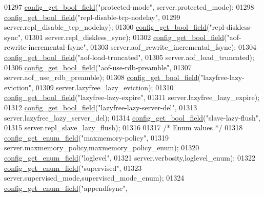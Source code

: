 \begin{DoxyCode}
{{{{{{{{{{01297     \hyperlink{config_8c_a7dbc6f4e538d2db2aa10ae47511d6c92}{config\_get\_bool\_field}(\textcolor{stringliteral}{"protected-mode"}, server.protected\_mode);
01298     \hyperlink{config_8c_a7dbc6f4e538d2db2aa10ae47511d6c92}{config\_get\_bool\_field}(\textcolor{stringliteral}{"repl-disable-tcp-nodelay"},
01299             server.repl\_disable\_tcp\_nodelay);
01300     \hyperlink{config_8c_a7dbc6f4e538d2db2aa10ae47511d6c92}{config\_get\_bool\_field}(\textcolor{stringliteral}{"repl-diskless-sync"},
01301             server.repl\_diskless\_sync);
01302     \hyperlink{config_8c_a7dbc6f4e538d2db2aa10ae47511d6c92}{config\_get\_bool\_field}(\textcolor{stringliteral}{"aof-rewrite-incremental-fsync"},
01303             server.aof\_rewrite\_incremental\_fsync);
01304     \hyperlink{config_8c_a7dbc6f4e538d2db2aa10ae47511d6c92}{config\_get\_bool\_field}(\textcolor{stringliteral}{"aof-load-truncated"},
01305             server.aof\_load\_truncated);
01306     \hyperlink{config_8c_a7dbc6f4e538d2db2aa10ae47511d6c92}{config\_get\_bool\_field}(\textcolor{stringliteral}{"aof-use-rdb-preamble"},
01307             server.aof\_use\_rdb\_preamble);
01308     \hyperlink{config_8c_a7dbc6f4e538d2db2aa10ae47511d6c92}{config\_get\_bool\_field}(\textcolor{stringliteral}{"lazyfree-lazy-eviction"},
01309             server.lazyfree\_lazy\_eviction);
01310     \hyperlink{config_8c_a7dbc6f4e538d2db2aa10ae47511d6c92}{config\_get\_bool\_field}(\textcolor{stringliteral}{"lazyfree-lazy-expire"},
01311             server.lazyfree\_lazy\_expire);
01312     \hyperlink{config_8c_a7dbc6f4e538d2db2aa10ae47511d6c92}{config\_get\_bool\_field}(\textcolor{stringliteral}{"lazyfree-lazy-server-del"},
01313             server.lazyfree\_lazy\_server\_del);
01314     \hyperlink{config_8c_a7dbc6f4e538d2db2aa10ae47511d6c92}{config\_get\_bool\_field}(\textcolor{stringliteral}{"slave-lazy-flush"},
01315             server.repl\_slave\_lazy\_flush);
01316 
01317     \textcolor{comment}{/* Enum values */}
01318     \hyperlink{config_8c_a70dc0615718e584a2c51615aba594479}{config\_get\_enum\_field}(\textcolor{stringliteral}{"maxmemory-policy"},
01319             server.maxmemory\_policy,maxmemory\_policy\_enum);
01320     \hyperlink{config_8c_a70dc0615718e584a2c51615aba594479}{config\_get\_enum\_field}(\textcolor{stringliteral}{"loglevel"},
01321             server.verbosity,loglevel\_enum);
01322     \hyperlink{config_8c_a70dc0615718e584a2c51615aba594479}{config\_get\_enum\_field}(\textcolor{stringliteral}{"supervised"},
01323             server.supervised\_mode,supervised\_mode\_enum);
01324     \hyperlink{config_8c_a70dc0615718e584a2c51615aba594479}{config\_get\_enum\_field}(\textcolor{stringliteral}{"appendfsync"},
}}}}}}}}}}
\end{DoxyCode}
